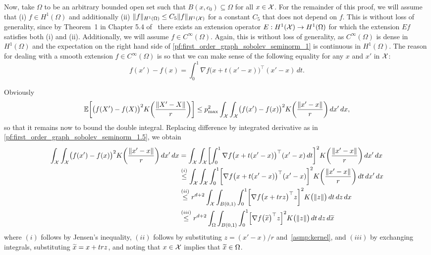 Now, take $\Omega$ to be an arbitrary bounded open set such that $B(x,c_0) \subseteq \Omega$ for all $x \in \mathcal{X}$. For the remainder of this proof, we will assume that (i) $f \in H^1(\Omega)$ and additionally (ii) $\|f\|_{H^1(\Omega)} \leq C_5 \|f\|_{H^1(\mathcal{X})}$ for a constant $C_5$ that does not depend on $f$. This is without loss of generality, since by Theorem~1 in Chapter 5.4 of~\citet{evans10} there exists an extension operator $E: H^1(\mathcal{X}) \to H^1(\Omega)$ for which the extension $Ef$ satisfies both (i) and (ii). Additionally, we will assume $f \in C^{\infty}(\Omega)$. Again, this is without loss of generality, as $C^{\infty}(\Omega)$ is dense in $H^1(\Omega)$ and the expectation on the right hand side of \eqref{pf:first_order_graph_sobolev_seminorm_1} is continuous in $H^1(\Omega)$. The reason for dealing with a smooth extension $f \in C^{\infty}(\Omega)$ is so that we can make sense of the following equality for any $x$ and $x'$ in $\mathcal{X}$:
\begin{equation}
\label{pf:first_order_graph_sobolev_seminorm_1.5}
f(x') - f(x) = \int_{0}^{1} \nabla f\bigl(x + t(x' - x)\bigr)^{\top} (x' - x) \,dt.
\end{equation}

Obviously
\begin{equation}
\mathbb{E}\biggl[\bigl(f(X') - f(X)\bigr)^2K\biggl(\frac{\|X' - X\|}{r}\biggr)\biggr] \leq p_{\max}^2 \int_{\mathcal{X}} \int_{\mathcal{X}} \bigl(f(x') - f(x)\bigr)^2 K\biggl(\frac{\|x' - x\|}{r}\biggr) \,dx' \,dx, \label{pf:first_order_graph_sobolev_seminorm_2}
\end{equation}
so that it remains now to bound the double integral. Replacing difference by integrated derivative as in \eqref{pf:first_order_graph_sobolev_seminorm_1.5}, we obtain
\begin{align}
\int_{\mathcal{X}} \int_{\mathcal{X}} \bigl(f(x') - f(x)\bigr)^2 K\biggl(\frac{\|x' - x\|}{r}\biggr) \,dx' \,dx & = \int_{\mathcal{X}} \int_{\mathcal{X}} \biggl[\int_{0}^{1} \nabla f\bigl(x + t(x' - x)\bigr)^{\top} (x' - x)\,dt\biggr]^2 K\biggl(\frac{\|x' - x\|}{r}\biggr) \,dx' \,dx \nonumber \\
& \overset{(i)}{\leq} \int_{\mathcal{X}} \int_{\mathcal{X}} \int_{0}^{1} \biggl[\nabla f\bigl(x + t(x' - x)\bigr)^{\top} (x' - x)\biggr]^2 K\biggl(\frac{\|x' - x\|}{r}\biggr) \,dt\,dx' \,dx \nonumber \\
& \overset{(ii)}{\leq} r^{d + 2} \int_{\mathcal{X}} \int_{B(0,1)} \int_{0}^{1} \biggl[\nabla f\bigl(x + trz\bigr)^{\top} z\biggr]^2 K\bigl(\|z\|\bigr) \,dt\,dz \,dx \nonumber \\
&  \overset{(iii)}{\leq} r^{d + 2} \int_{\Omega} \int_{B(0,1)} \int_{0}^{1} \Bigl[\nabla f\bigl(\widetilde{x}\bigr)^{\top} z\Bigr]^2 K\bigl(\|z\|\bigr) \,dt \,dz \,d\widetilde{x} \label{pf:first_order_graph_sobolev_seminorm_3} 
\end{align}
where $(i)$ follows by Jensen's inequality, $(ii)$ follows by substituting $z = (x' - x)/r$ and~\ref{asmp:kernel}, and $(iii)$ by exchanging integrals, substituting $\widetilde{x} = x + trz$, and noting that $x \in \mathcal{X}$ implies that $\widetilde{x} \in \Omega$.

